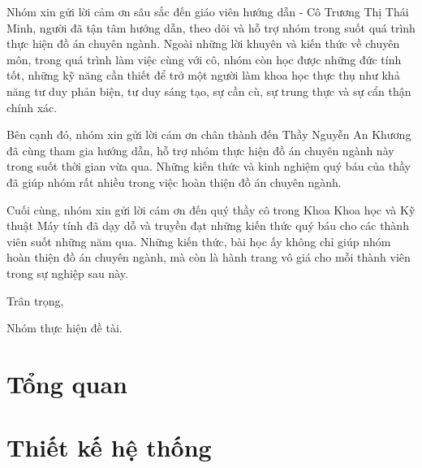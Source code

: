 \documentclass[a4paper, twoside, 12pt]{report}
\theoremstyle{definition}
\begin{document}
Nhóm xin gửi lời cảm ơn sâu sắc đến giáo viên hướng dẫn - Cô Trương Thị Thái Minh, người đã tận tâm hướng dẫn, theo dõi và hỗ trợ nhóm trong suốt quá trình thực hiện đồ án chuyên ngành. Ngoài những lời khuyên và kiến thức về chuyên môn, trong quá trình làm việc cùng với cô, nhóm còn học được những đức tính tốt, những kỹ năng cần thiết để trở một người làm khoa học thực thụ như khả năng tư duy phản biện, tư duy sáng tạo, sự cần cù, sự trung thực và sự cẩn thận chính xác.

Bên cạnh đó, nhóm xin gửi lời cám ơn chân thành đến Thầy Nguyễn An Khương đã cùng tham gia hướng dẫn, hỗ trợ nhóm thực hiện đồ án chuyên ngành này trong suốt thời gian vừa qua. Những kiến thức và kinh nghiệm quý báu của thầy đã giúp nhóm rất nhiều trong việc hoàn thiện đồ án chuyên ngành.

Cuối cùng, nhóm xin gửi lời cám ơn đến quý thầy cô trong Khoa Khoa học và Kỹ thuật Máy tính đã dạy dỗ và truyền đạt những kiến thức quý báu cho các thành viên suốt những năm qua. Những kiến thức, bài học ấy không chỉ giúp nhóm hoàn thiện đồ án chuyên ngành, mà còn là hành trang vô giá cho mỗi thành viên trong sự nghiệp sau này.

\hspace{10cm} Trân trọng,

\hspace{9cm} Nhóm thực hiện đề tài.

\setlength{\parskip}{0mm}

\tableofcontents

\newpage
\listoffigures
\newpage

\listoftables



\chapter{Tổng quan}



% 


\chapter{Thiết kế hệ thống}
% 
\end{document}
